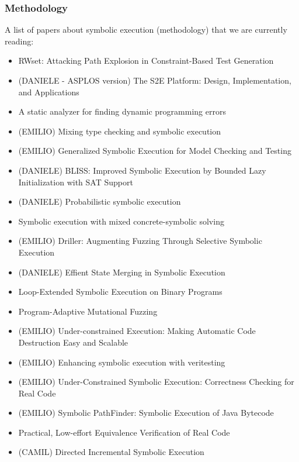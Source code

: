 \documentclass[10pt, a4paper]{article}
\begin{document}
\subsubsection{Methodology}
A list of papers about symbolic execution (methodology) that we are currently reading:
\begin{itemize}
  \item \cite{BCE-TACAS08} RWset: Attacking Path Explosion in Constraint-Based Test Generation
  \item (DANIELE - ASPLOS version) \cite{CKC-TOCS12} The S2E Platform: Design, Implementation, and Applications
  \item \cite{BPS-SPE00} A static analyzer for finding dynamic programming errors
  \item (EMILIO) \cite{KCF-PLDI10} Mixing type checking and symbolic execution
  \item (EMILIO) \cite{KPV-TACAS03} Generalized Symbolic Execution for Model Checking and Testing
  \item (DANIELE) \cite{BLISS-TSE15} BLISS: Improved Symbolic Execution by Bounded Lazy Initialization with SAT Support
  \item (DANIELE) \cite{GDV-ISSTA12} Probabilistic symbolic execution
  \item \cite{PRV-ISSTA11} Symbolic execution with mixed concrete-symbolic solving
  \item (EMILIO) \cite{DRILLER-NDSS16} Driller: Augmenting Fuzzing Through Selective Symbolic Execution 
  \item (DANIELE) \cite{KKB-PLDI12} Effient State Merging in Symbolic Execution
  \item \cite{SPM-ISSTA09} Loop-Extended Symbolic Execution on Binary Programs
  \item \cite{CWD-SSP15} Program-Adaptive Mutational Fuzzing
  \item (EMILIO) \cite{ED-ISSTA07} Under-constrained Execution: Making Automatic Code Destruction Easy and Scalable
  \item (EMILIO) \cite{VERITESTING-ICSE14} Enhancing symbolic execution with veritesting
  \item (EMILIO) \cite{UCKLEE-USEC15} Under-Constrained Symbolic Execution: Correctness Checking for Real Code
  \item (EMILIO) \cite{PATHFINDER-ASE10} Symbolic PathFinder: Symbolic Execution of Java Bytecode
  \item \cite{RE-CAV11} Practical, Low-effort Equivalence Verification of Real Code
  \item (CAMIL)\cite{PYR-PLDI11} Directed Incremental Symbolic Execution

\end{itemize}
\end{document}
